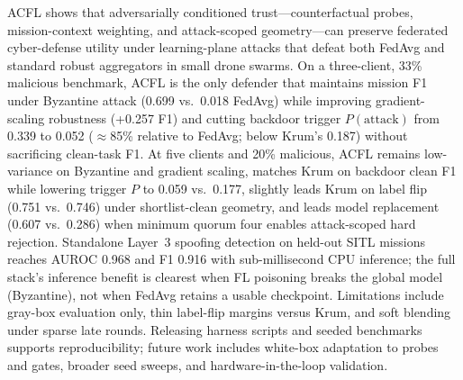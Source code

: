 \documentclass[journal]{IEEEtran}
\begin{document}
ACFL shows that adversarially conditioned trust---counterfactual probes, mission-context weighting, and attack-scoped geometry---can preserve federated cyber-defense utility under learning-plane attacks that defeat both FedAvg and standard robust aggregators in small drone swarms.
On a three-client, 33\% malicious benchmark, ACFL is the only defender that maintains mission F1 under Byzantine attack (0.699 vs.\ 0.018 FedAvg) while improving gradient-scaling robustness (+0.257 F1) and cutting backdoor trigger $P(\text{attack})$ from 0.339 to 0.052 ($\approx$85\% relative to FedAvg; below Krum's 0.187) without sacrificing clean-task F1.
At five clients and 20\% malicious, ACFL remains low-variance on Byzantine and gradient scaling, matches Krum on backdoor clean F1 while lowering trigger $P$ to 0.059 vs.\ 0.177, slightly leads Krum on label flip (0.751 vs.\ 0.746) under shortlist-clean geometry, and leads model replacement (0.607 vs.\ 0.286) when minimum quorum four enables attack-scoped hard rejection.
Standalone Layer~3 spoofing detection on held-out SITL missions reaches AUROC 0.968 and F1 0.916 with sub-millisecond CPU inference; the full stack's inference benefit is clearest when FL poisoning breaks the global model (Byzantine), not when FedAvg retains a usable checkpoint.
Limitations include gray-box evaluation only, thin label-flip margins versus Krum, and soft blending under sparse late rounds.
Releasing harness scripts and seeded benchmarks supports reproducibility; future work includes white-box adaptation to probes and gates, broader seed sweeps, and hardware-in-the-loop validation.



\end{document}
